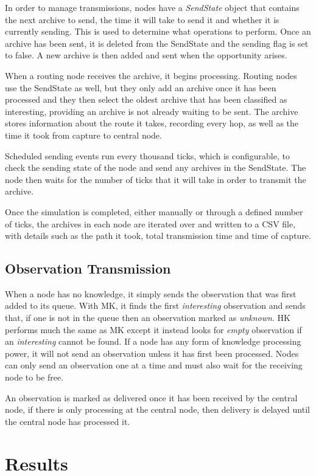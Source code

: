 	In order to manage transmissions, nodes have a \textit{SendState} object that contains the next archive to send, the time it will take to send it and whether it is currently sending. This is used to determine what operations to perform. Once an archive has been sent, it is deleted from the SendState and the sending flag is set to false. A new archive is then added and sent when the opportunity arises.
	
	When a routing node receives the archive, it begins processing. Routing nodes use the SendState as well, but they only add an archive once it has been processed and they then select the oldest archive that has been classified as interesting, providing an archive is not already waiting to be sent. The archive stores information about the route it takes, recording every hop, as well as the time it took from capture to central node.
	
	Scheduled sending events run every thousand ticks, which is configurable, to check the sending state of the node and send any archives in the SendState. The node then waits for the number of ticks that it will take in order to transmit the archive.
	
	Once the simulation is completed, either manually or through a defined number of ticks, the archives in each node are iterated over and written to a CSV file, with details such as the path it took, total transmission time and time of capture.

\subsection{Observation Transmission}
When a node has no knowledge, it simply sends the observation that was first added to its queue. With MK, it finds the first \textit{interesting} observation and sends that, if one is not in the queue then an observation marked as \textit{unknown}.  HK performs much the same as MK except it instead looks for \textit{empty} observation if an \textit{interesting} cannot be found. If a node has any form of knowledge processing power, it will not send an observation unless it has first been processed. Nodes can only send an observation one at a time and must also wait for the receiving node to be free.

An observation is marked as delivered once it has been received by the central node, if there is only processing at the central node, then delivery is delayed until the central node has processed it.


\section{Results}\label{sim:res}
